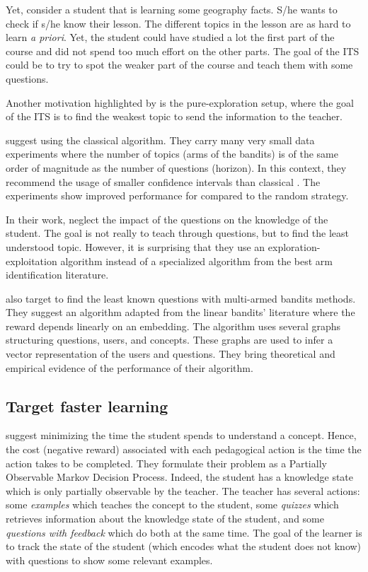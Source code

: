 Yet, consider a student that is learning some geography facts. S/he wants to check if s/he know their lesson. The different topics in the lesson are as hard to learn \emph{a priori}. Yet, the student could have studied a lot the first part of the course and did not spend too much effort on the other parts. The goal of the ITS could be to try to spot the weaker part of the course and teach them with some questions.

Another motivation highlighted by \citet{melesko2019computer} is the pure-exploration setup, where the goal of the ITS is to find the weakest topic to send the information to the teacher. 

\citet{melesko2019computer} suggest using the classical \UCB algorithm. They carry many very small data experiments where the number of topics (arms of the bandits) is of the same order of magnitude as the number of questions (horizon). In this context, they recommend the usage of smaller confidence intervals than classical \UCB. The experiments show improved performance for \UCB compared to the random strategy. 

In their work, \citet{melesko2019computer} neglect the impact of the questions on the knowledge of the student. The goal is not really to teach through questions, but to find the least understood topic. However, it is surprising that they use an exploration-exploitation algorithm instead of a specialized algorithm from the best arm identification literature. 

\citet{teng2018interactive} also target to find the least known questions with multi-armed bandits methods. They suggest an algorithm adapted from the linear bandits' literature where the reward depends linearly on an embedding. The algorithm uses several graphs structuring questions, users, and concepts. These graphs are used to infer a vector representation of the users and questions. They bring theoretical and empirical evidence of the performance of their algorithm. 

\subsection{Target faster learning}
\citet{rafferty2016faster} suggest minimizing the time the student spends to understand a concept. Hence, the cost (negative reward) associated with each pedagogical action is the time the action takes to be completed. They formulate their problem as a Partially Observable Markov Decision Process. Indeed, the student has a knowledge state which is only partially observable by the teacher. The teacher has several actions: some \emph{examples} which teaches the concept to the student, some \emph{quizzes} which retrieves information about the knowledge state of the student, and some \emph{questions with feedback} which do both at the same time.  The goal of the learner is to track the state of the student (which encodes what the student does not know) with questions to show some relevant examples. 

